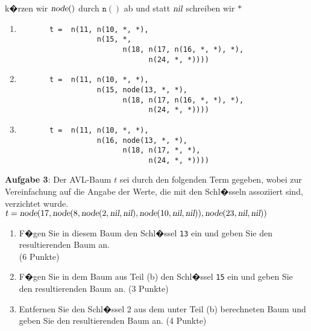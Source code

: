 \documentclass{article}
\begin{document}
k�rzen wir $\textsl{node}()$ durch $\mathtt{n}()$ ab und statt $\textsl{nil}$ schreiben wir $\mathtt{*}$
\begin{enumerate}
\item \begin{verbatim}
       t =  n(11, n(10, *, *),
                  n(15, *, 
                        n(18, n(17, n(16, *, *), *), 
                              n(24, *, *))))
       \end{verbatim}
\item \begin{verbatim}
       t =  n(11, n(10, *, *),
                  n(15, node(13, *, *),
                        n(18, n(17, n(16, *, *), *), 
                              n(24, *, *))))
      \end{verbatim}
\item \begin{verbatim}
       t =  n(11, n(10, *, *),
                  n(16, node(13, *, *),
                        n(18, n(17, *, *), 
                              n(24, *, *))))
      \end{verbatim}
\end{enumerate}
\vspace{0.3cm}

\noindent
\textbf{Aufgabe 3}: Der AVL-Baum $t$ sei durch den folgenden Term gegeben,
wobei zur Vereinfachung auf die Angabe der Werte, die mit den Schl�sseln
assoziiert sind, verzichtet wurde.
\\[0.2cm]
\hspace*{1.3cm}
$t = \textsl{node}(17, 
           \textsl{node}(8, 
               \textsl{node}(2, \textsl{nil}, \textsl{nil}),
               \textsl{node}(10, \textsl{nil}, \textsl{nil})), 
           \textsl{node}(23,\textsl{nil},\textsl{nil}))$
\begin{enumerate}
\item F�gen Sie  in diesem Baum den Schl�ssel \texttt{13} ein und geben Sie den
      resultierenden Baum an.   \\[0.2cm]
      \hspace*{\fill} (6 Punkte)
\item F�gen Sie in dem Baum aus Teil (b) den Schl�ssel \texttt{15} ein und geben Sie den
      resultierenden Baum an.
      \hspace*{\fill} (3 Punkte)
\item Entfernen Sie den Schl�ssel 2 aus dem unter Teil (b) berechneten Baum und geben Sie
      den resultierenden Baum an.
      \hspace*{\fill} (4 Punkte)
\end{enumerate}
\pagebreak
\end{document}
